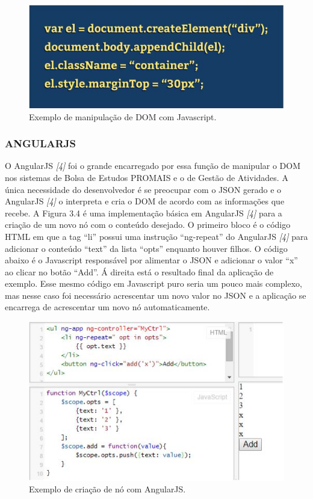 \documentclass[
  12pt,				%
  openany,
  oneside,
  a4paper,			%
  english,			%
  brazil
]{article}
\numberwithin{figure}{section}
\numberwithin{table}{section}
\begin{document}
\begin{figure}[!htb]
\centering
\includegraphics[width=1\textwidth]{figura33}
\caption{Exemplo de manipulação de DOM com Javascript.}
\end{figure}


\subsubsection{ANGULARJS}

O AngularJS \textit{[4]} foi o grande encarregado por essa função de manipular o DOM nos sistemas de Bolsa de Estudos PROMAIS e o de Gestão de Atividades. A única necessidade do desenvolvedor é se preocupar com o JSON gerado e o AngularJS \textit{[4]} o interpreta e cria o DOM de acordo com as informações que recebe.
A Figura 3.4 é uma implementação básica em AngularJS \textit{[4]} para a criação de um novo nó com o conteúdo desejado. O primeiro bloco é o código HTML em que a tag “li” possui uma instrução “ng-repeat” do AngularJS \textit{[4]} para adicionar o conteúdo “text” da lista “opts” enquanto houver filhos. O código abaixo é o Javascript responsável por alimentar o JSON e adicionar o valor “x” ao clicar no botão “Add”. Á direita está o resultado final da aplicação de exemplo.
Esse mesmo código em Javascript puro seria um pouco mais complexo, mas nesse caso foi necessário acrescentar um novo valor no JSON e a aplicação se encarrega de acrescentar um novo nó automaticamente.

\begin{figure}[!htb]
\centering
\includegraphics[width=1\textwidth]{figura34}
\caption{Exemplo de criação de nó com AngularJS.}
\end{figure}
\end{document}
